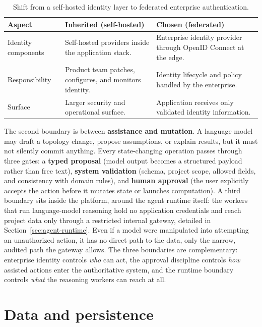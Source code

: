 \begin{table}[H]
  \centering
  \begin{tabularx}{\linewidth}{@{}
      >{\raggedright\arraybackslash}p{3.2cm}
      >{\raggedright\arraybackslash}X
      >{\raggedright\arraybackslash}X @{}}
    \toprule
    \textbf{Aspect} & \textbf{Inherited (self-hosted)} & \textbf{Chosen (federated)} \\
    \midrule
    Identity components & Self-hosted providers inside the application stack. &
      Enterprise identity provider through OpenID Connect at the edge. \\
    \addlinespace
    Responsibility & Product team patches, configures, and monitors identity. &
      Identity lifecycle and policy handled by the enterprise. \\
    \addlinespace
    Surface & Larger security and operational surface. & Application receives only
      validated identity information. \\
    \bottomrule
  \end{tabularx}
  \caption{Shift from a self-hosted identity layer to federated enterprise
    authentication.}
  \label{tab:auth}
\end{table}

The second boundary is between \textbf{assistance and mutation}. A language model
may draft a topology change, propose assumptions, or explain results, but it must
not silently commit anything. Every state-changing operation passes through three
gates: a \textbf{typed proposal} (model output becomes a structured payload rather
than free text), \textbf{system validation} (schema, project scope, allowed
fields, and consistency with domain rules), and \textbf{human approval} (the user
explicitly accepts the action before it mutates state or launches computation).
A third boundary sits inside the platform, around the agent runtime itself: the
workers that run language-model reasoning hold no application credentials and
reach project data only through a restricted internal gateway, detailed in
Section~\ref{sec:agent-runtime}. Even if a model were manipulated into attempting
an unauthorized action, it has no direct path to the data, only the narrow,
audited path the gateway allows. The three boundaries are complementary: enterprise
identity controls \emph{who} can act, the approval discipline controls \emph{how}
assisted actions enter the authoritative system, and the runtime boundary controls
\emph{what} the reasoning workers can reach at all.

\section{Data and persistence}
\label{sec:persistence}

